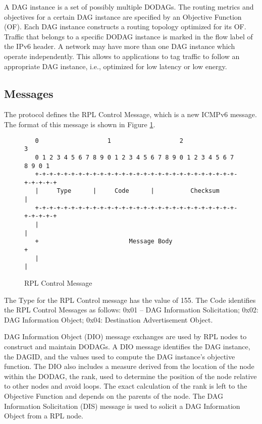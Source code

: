 A DAG instance is a set of possibly multiple DODAGs. The routing metrics and objectives for a certain DAG instance are specified by an Objective Function (OF). Each DAG instance constructs a routing topology optimized for its OF. Traffic that belongs to a specific DODAG instance is marked in the flow label of the IPv6 header. A network may have more than one DAG instance which operate independently. This allows to applications to tag traffic to follow an appropriate DAG instance, i.e., optimized for low latency or low energy.  

\subsection{Messages}
The protocol defines the RPL Control Message, which is a new ICMPv6 message. The format of this message is shown in Figure \ref{fig:rpl.control.message}.
\begin{figure}[htp]
\begin{mylisting}
\begin{verbatim}
   0                   1                   2                   3
   0 1 2 3 4 5 6 7 8 9 0 1 2 3 4 5 6 7 8 9 0 1 2 3 4 5 6 7 8 9 0 1
   +-+-+-+-+-+-+-+-+-+-+-+-+-+-+-+-+-+-+-+-+-+-+-+-+-+-+-+-+-+-+-+-+
   |     Type      |     Code      |          Checksum             |
   +-+-+-+-+-+-+-+-+-+-+-+-+-+-+-+-+-+-+-+-+-+-+-+-+-+-+-+-+-+-+-+-+
   |                                                               |
   +                         Message Body                          +
   |                                                               |
\end{verbatim}
\end{mylisting}
\caption{RPL Control Message}\label{fig:rpl.control.message}
\end{figure}

The Type for the RPL Control message has the value of 155. The Code identifies the RPL Control Messages as follows:  0x01 -- DAG Information Solicitation; 0x02: DAG Information Object; 0x04: Destination Advertisement Object. 

DAG Information Object (DIO) message exchanges are used by RPL nodes to construct and maintain DODAGs. A DIO message identifies the DAG instance, the DAGID, and the values used to compute the DAG instance's objective function. The DIO also includes a measure derived from the location of the node within the DODAG, the rank, used to determine the position of the node relative to other nodes and avoid loops. The exact calculation of the rank is left to the Objective Function and  depends on the parents of the node. The DAG Information Solicitation (DIS) message is used to solicit a DAG Information Object from a RPL node. 

